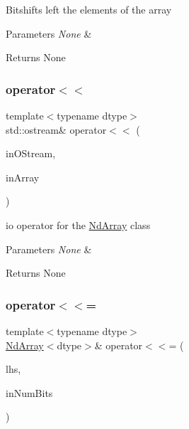 Bitshifts left the elements of the array


\begin{DoxyParams}{Parameters}
{\em None} & \\
\hline
\end{DoxyParams}
\begin{DoxyReturn}{Returns}
None 
\end{DoxyReturn}
\mbox{\label{class_num_c_1_1_nd_array_a7bc4555bca4773adf8f4e51ca73c13ed}} 
\subsubsection{\texorpdfstring{operator$<$$<$}{operator<<}\hspace{0.1cm}{\footnotesize\ttfamily [2/2]}}
{\footnotesize\ttfamily template$<$typename dtype$>$ \\
std\+::ostream\& operator$<$$<$ (\begin{DoxyParamCaption}\item[{std\+::ostream \&}]{in\+O\+Stream,  }\item[{const \mbox{\hyperlink{class_num_c_1_1_nd_array}{Nd\+Array}}$<$ dtype $>$ \&}]{in\+Array }\end{DoxyParamCaption})\hspace{0.3cm}{\ttfamily [friend]}}

io operator for the \mbox{\hyperlink{class_num_c_1_1_nd_array}{Nd\+Array}} class


\begin{DoxyParams}{Parameters}
{\em None} & \\
\hline
\end{DoxyParams}
\begin{DoxyReturn}{Returns}
None 
\end{DoxyReturn}
\mbox{\label{class_num_c_1_1_nd_array_ad35a1fb99d88618e4446403e9f77d228}} 
\subsubsection{\texorpdfstring{operator$<$$<$=}{operator<<=}}
{\footnotesize\ttfamily template$<$typename dtype$>$ \\
\mbox{\hyperlink{class_num_c_1_1_nd_array}{Nd\+Array}}$<$dtype$>$\& operator$<$$<$= (\begin{DoxyParamCaption}\item[{\mbox{\hyperlink{class_num_c_1_1_nd_array}{Nd\+Array}}$<$ dtype $>$ \&}]{lhs,  }\item[{\mbox{\hyperlink{namespace_num_c_a60b2e2f49e1ff61059731c154e560869}{uint8}}}]{in\+Num\+Bits }\end{DoxyParamCaption})\hspace{0.3cm}{\ttfamily [friend]}}

